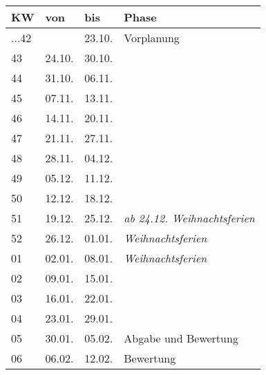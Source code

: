 \documentclass[a4paper,12pt]{article}
\begin{document}
\begin{center}
  \begin{tabular}{llll}
    \textbf{KW} & \textbf{von} & \textbf{bis} & \textbf{Phase}\\
    \hline
    ...42 &  & 23.10. & Vorplanung\\ 
    \hline
    43 & 24.10. & 30.10. & \\
    \hline
    44 & 31.10. & 06.11. & \\
    \hline
    45 & 07.11. & 13.11. & \\
    \hline
    46 & 14.11. & 20.11. & \\
    \hline
    47 & 21.11. & 27.11. & \\
    \hline
    48 & 28.11. & 04.12. & \\ 
    \hline
    49 & 05.12. & 11.12. & \\
    \hline
    50 & 12.12. & 18.12. & \\
    \hline
    51 & 19.12. & 25.12. & \emph{ab 24.12. Weihnachtsferien}\\
    \hline
    52 & 26.12. & 01.01. & \emph{Weihnachtsferien}\\
    \hline
    01 & 02.01. & 08.01. & \emph{Weihnachtsferien}\\
    \hline
    02 & 09.01. & 15.01. & \\
    \hline
    03 & 16.01. & 22.01. & \\
    \hline
    04 & 23.01. & 29.01. & \\
    \hline
    05 & 30.01. & 05.02. & Abgabe und Bewertung\\
    \hline
    06 & 06.02. & 12.02. & Bewertung\\
    \hline
  \end{tabular}
\end{center}


\end{document}
